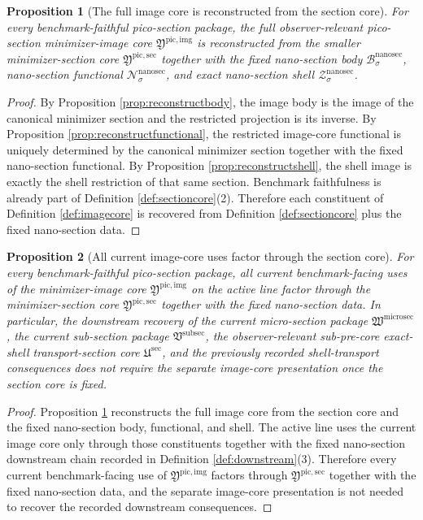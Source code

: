 \documentclass[11pt]{article}
\newcommand{\SubSectionPackage}{\mathfrak V^{\mathrm{subsec}}}
\newcommand{\MicroSectionPackage}{\mathfrak W^{\mathrm{microsec}}}
\newcommand{\SubPreSectionCore}{\mathfrak U^{\mathrm{sec}}}
\newcommand{\NanoSectionBody}[1]{\mathcal B_{#1}^{\mathrm{nanosec}}}
\newcommand{\NanoSectionFunctional}[1]{\mathscr N_{#1}^{\mathrm{nanosec}}}
\newcommand{\NanoSectionShell}[1]{\mathcal Z_{#1}^{\mathrm{nanosec}}}
\newcommand{\PicoImageCore}{\mathfrak Y^{\mathrm{pic,img}}}
\newcommand{\PicoMinSectionCore}{\mathfrak Y^{\mathrm{pic,sec}}}
\newtheorem{proposition}{Proposition}
\begin{document}
\begin{proposition}[The full image core is reconstructed from the section core]
\label{prop:reconstructimage}
For every benchmark-faithful pico-section package, the full observer-relevant pico-section minimizer-image core \(\PicoImageCore\) is reconstructed from the smaller minimizer-section core \(\PicoMinSectionCore\) together with the fixed nano-section body \(\NanoSectionBody{\sigma}\), nano-section functional \(\NanoSectionFunctional{\sigma}\), and exact nano-section shell \(\NanoSectionShell{\sigma}\).
\end{proposition}

\begin{proof}
By Proposition \ref{prop:reconstructbody}, the image body is the image of the canonical minimizer section and the restricted projection is its inverse. By Proposition \ref{prop:reconstructfunctional}, the restricted image-core functional is uniquely determined by the canonical minimizer section together with the fixed nano-section functional. By Proposition \ref{prop:reconstructshell}, the shell image is exactly the shell restriction of that same section. Benchmark faithfulness is already part of Definition \ref{def:sectioncore}(2). Therefore each constituent of Definition \ref{def:imagecore} is recovered from Definition \ref{def:sectioncore} plus the fixed nano-section data.
\end{proof}

\begin{proposition}[All current image-core uses factor through the section core]
\label{prop:downstream}
For every benchmark-faithful pico-section package, all current benchmark-facing uses of the minimizer-image core \(\PicoImageCore\) on the active line factor through the minimizer-section core \(\PicoMinSectionCore\) together with the fixed nano-section data. In particular, the downstream recovery of the current micro-section package \(\MicroSectionPackage\), the current sub-section package \(\SubSectionPackage\), the observer-relevant sub-pre-core exact-shell transport-section core \(\SubPreSectionCore\), and the previously recorded shell-transport consequences does not require the separate image-core presentation once the section core is fixed.
\end{proposition}

\begin{proof}
Proposition \ref{prop:reconstructimage} reconstructs the full image core from the section core and the fixed nano-section body, functional, and shell. The active line uses the current image core only through those constituents together with the fixed nano-section downstream chain recorded in Definition \ref{def:downstream}(3). Therefore every current benchmark-facing use of \(\PicoImageCore\) factors through \(\PicoMinSectionCore\) together with the fixed nano-section data, and the separate image-core presentation is not needed to recover the recorded downstream consequences.
\end{proof}
\end{document}
